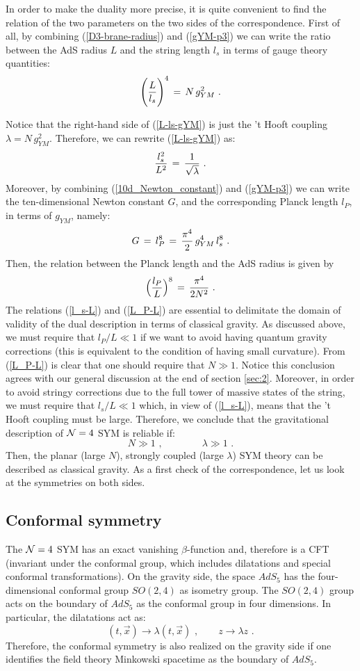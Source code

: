 \documentclass[12pt,notitlepage]{article}
\newcommand{\beq}{\begin{equation}}
\newcommand{\eeq}{\end{equation}}
\begin{document}
In order to make the duality  more precise, it is quite convenient to find the relation of the two parameters on the two sides of the correspondence. First of all, by combining (\ref{D3-brane-radius}) and (\ref{gYM-p3}) we can write the ratio between the AdS radius $L$ and the string length $l_s$ in terms of gauge theory quantities:
\beq
\Bigg({L\over l_s}\Bigg)^4 \,=\,N\,g^2_{YM}\,\,.
\label{L-ls-gYM}
\eeq




Notice that the  right-hand side of (\ref{L-ls-gYM}) is just the 't Hooft coupling $\lambda=N\,g^2_{YM}$. Therefore, we can rewrite (\ref{L-ls-gYM}) as:
\beq
{l_s^2\over L^2}\,=\,{1\over \sqrt{\lambda}}\,\,.
\label{l_s-L}
\eeq
Moreover, by combining (\ref{10d_Newton_constant}) and (\ref{gYM-p3}) we can write the ten-dimensional Newton constant $G$, and the corresponding Planck length $l_P$, in terms of $g_{YM}$, namely:
\beq
G\,=\,l_P^8\,=\, {\pi^4\over 2}\,g^4_{YM}\,l_s^8\,\,.
\eeq
Then, the relation between the Planck length and the AdS radius is given by
\beq
\Big({l_P\over L}\Big)^8\,=\,{\pi^4\over 2 N^2}\,\,.
\label{L_P-L}
\eeq
The relations (\ref{l_s-L}) and (\ref{L_P-L}) are essential to delimitate the domain of validity of the dual description in terms of {\rm classical} gravity.  As discussed above, we must require that $l_P/ L\ll 1$ if we want to avoid having quantum gravity corrections (this is equivalent to the condition of having small curvature). From (\ref{L_P-L}) is clear that one should require that $N\gg 1$. Notice this conclusion agrees with our general discussion at the end of section \ref{sec:2}. Moreover, in order to avoid stringy corrections due to the full tower of massive states of the string, we must require that
$l_s/ L\ll 1$ which, in view of (\ref{l_s-L}), means that the 't Hooft coupling must be large.  
Therefore, we conclude that the gravitational description of ${\cal N}=4$ SYM is reliable if:
\beq
N\gg 1\,\,,
\qquad\qquad
\lambda \gg 1\,\,.
\eeq
Then, the planar (large $N$), strongly coupled (large $\lambda$) SYM theory can be described as classical gravity. As a first check of the correspondence, let us look at the symmetries on both sides.
 
 \subsection{Conformal symmetry}
 
 
 The ${\cal N}=4$ SYM has an exact vanishing $\beta$-function and, therefore  is a CFT (invariant under the conformal group, which includes dilatations and special conformal transformations). On the gravity side, the space $AdS_5$ has the four-dimensional conformal group $SO(2,4)$  as isometry group. The $SO(2,4)$ group acts on the boundary  of $AdS_5$  as the conformal group in four dimensions. In particular, the dilatations act as:
 \beq
 (t,\vec x)\to \lambda  (t,\vec x)\,\,,
 \qquad
 z\to \lambda z\,\,.
 \eeq
 Therefore, the conformal symmetry is also realized on the gravity side if one identifies the field theory Minkowski spacetime as the boundary of $AdS_5$. 
 
\end{document}
